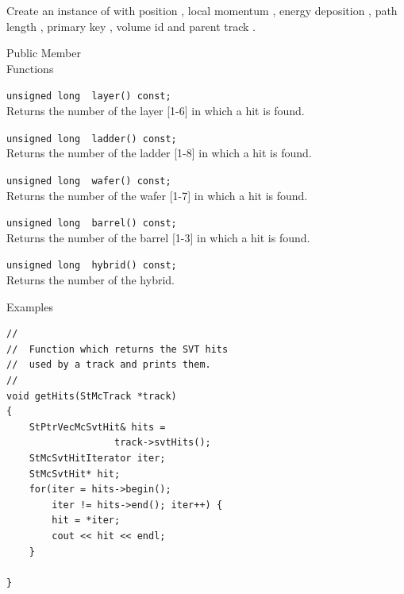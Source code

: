 \begin{Entry}
    Create an instance of  with position , local momentum ,
    energy deposition , path length , primary key ,
    volume id  and parent track . 

\item[Public Member\\ Functions]

    \verb+unsigned long  layer() const;+\\
    Returns the number of the layer [1-6] in which a hit is found. 

    \verb+unsigned long  ladder() const;+\\
    Returns the number of the ladder [1-8] in which a hit is found. 

    \verb+unsigned long  wafer() const;+\\
    Returns the number of the wafer [1-7] in which a hit is found. 

    \verb+unsigned long  barrel() const;+\\
    Returns the number of the barrel [1-3] in which a hit is found. 

    \verb+unsigned long  hybrid() const;+\\
    Returns the number of the hybrid.

\item[Examples]
{\footnotesize
\begin{verbatim}
//
//  Function which returns the SVT hits
//  used by a track and prints them.
//
void getHits(StMcTrack *track)
{
    StPtrVecMcSvtHit& hits =
                   track->svtHits();
    StMcSvtHitIterator iter;
    StMcSvtHit* hit;
    for(iter = hits->begin();
        iter != hits->end(); iter++) {
        hit = *iter;
        cout << hit << endl;
    }
    
}
\end{verbatim}
}%
\end{Entry}
\clearpage
%
%
